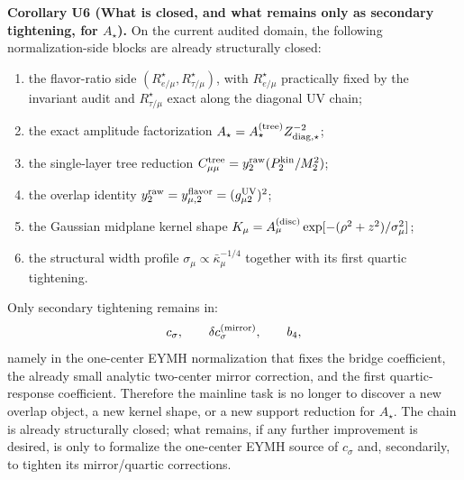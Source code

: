 \documentclass[aps,prd,onecolumn,notitlepage,nofootinbib,superscriptaddress,11pt,floatfix]{revtex4-2}
\begin{document}
\medskip\noindent\textbf{Corollary U6 (What is closed, and what remains only as secondary tightening, for \texorpdfstring{$A_\star$}{A*}).}
On the current audited domain, the following normalization-side blocks are already structurally closed:
\begin{enumerate}
\item the flavor-ratio side \((R_{e/\mu}^\star,R_{\tau/\mu}^\star)\), with \(R_{e/\mu}^\star\) practically fixed by the invariant audit and \(R_{\tau/\mu}^\star\) exact along the diagonal UV chain;
\item the exact amplitude factorization \(A_\star=A_\star^{\rm(tree)}Z_{{\rm diag},\star}^{-2}\);
\item the single-layer tree reduction \(C_{\mu\mu}^{\rm tree}=y_2^{\rm raw}(P_2^{\rm kin}/M_2^2)\);
\item the overlap identity \(y_2^{\rm raw}=y_{\mu,2}^{\rm flavor}=(g_{\mu2}^{\rm UV})^2\);
\item the Gaussian midplane kernel shape \(K_\mu=A_\mu^{\rm(disc)}\exp[-(\rho^2+z^2)/\sigma_\mu^2]\);
\item the structural width profile \(\sigma_\mu\propto \bar\kappa_\mu^{-1/4}\) together with its first quartic tightening.
\end{enumerate}
Only secondary tightening remains in:
\[
c_\sigma,\qquad
\delta c_\sigma^{\rm(mirror)},\qquad
b_4,
\]
namely in the one-center EYMH normalization that fixes the bridge coefficient, the already small analytic two-center mirror correction, and the first quartic-response coefficient.  Therefore the mainline task is no longer to discover a new overlap object, a new kernel shape, or a new support reduction for \(A_\star\).  The chain is already structurally closed; what remains, if any further improvement is desired, is only to formalize the one-center EYMH source of \(c_\sigma\) and, secondarily, to tighten its mirror/quartic corrections.
\end{document}
